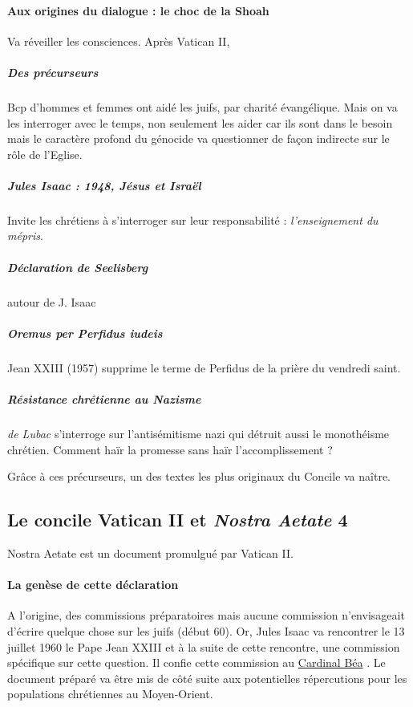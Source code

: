     \paragraph{Aux origines du dialogue : le choc de la Shoah}
    Va réveiller les consciences. Après Vatican II, 
    
    \subparagraph{Des précurseurs} Bcp d'hommes et femmes ont aidé les juifs, par charité évangélique. Mais on va les interroger avec le temps, non seulement les aider car ils sont dans le besoin mais le caractère profond du génocide va questionner de façon indirecte sur le rôle de l'Eglise.
    
    \subparagraph{Jules Isaac : 1948, Jésus et Israël} Invite les chrétiens à s'interroger sur leur responsabilité : \textit{l'enseignement du mépris}. 
    
    \subparagraph{Déclaration de Seelisberg} autour de J. Isaac 
    
    \subparagraph{Oremus per Perfidus iudeis} Jean XXIII (1957) supprime le terme de Perfidus de la prière du vendredi saint. 
    
    \subparagraph{Résistance chrétienne au Nazisme}
    \textit{de Lubac} s'interroge sur l'antisémitisme nazi qui détruit aussi le monothéisme chrétien.  Comment haïr la promesse sans haïr l'accomplissement ?  
  
  Grâce à ces précurseurs, un des textes les plus originaux du Concile va naître.
  

  
  \subsection{Le concile Vatican II et \emph{Nostra Aetate} 4}
  
  
   Nostra Aetate est un document promulgué par Vatican II.
    
    \paragraph{La genèse de cette déclaration} A l'origine, des commissions préparatoires mais aucune commission n'envisageait d'écrire quelque chose sur les juifs (début 60).
    Or, Jules Isaac va rencontrer le 13 juillet 1960 le Pape Jean XXIII et à la suite de cette rencontre, une commission spécifique sur cette question. Il confie cette commission au \href{https://fr.wikipedia.org/wiki/Augustin\_Bea}{Cardinal Béa} .
    Le document préparé va être mis de côté suite aux potentielles répercutions pour les populations chrétiennes au Moyen-Orient.
    
